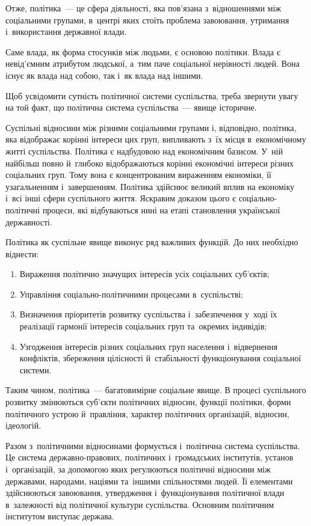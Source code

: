 \documentclass[a5paper,oneside,DIV=12,12pt,headings=small]{scrartcl}
\begin{document}
		Отже, політика~— це сфера діяльності, яка пов'язана з~відношеннями між соціальними групами, в~центрі яких стоїть проблема завоювання, утримання і~використання державної влади.
		
		Саме влада, як форма стосунків між людьми, є основою політики. Влада є невід'ємним атрибутом людської, а~тим паче соціальної нерівності людей. Вона існує як влада над собою, так і~як влада над іншими.
		
		Щоб усвідомити сутність політичної системи суспільства, треба звернути увагу на той факт, що політична система суспільства~— явище історичне.
		
		Суспільні відносини між різними соціальними групами і, відповідно, політика, яка відображає корінні інтереси цих груп, випливають з~їх місця в~економічному житті суспільства. Політика є надбудовою над економічним базисом. У~ній найбільш повно й~глибоко відображаються корінні економічні інтереси різних соціальних груп. Тому вона є концентрованим вираженням економіки, її узагальненням і~завершенням. Політика здійснює великий вплив на економіку і~всі інші сфери суспільного життя. Яскравим доказом цього є соціально-політичні процеси, які відбуваються нині на етапі становлення української державності.
		
		Політика як суспільне явище виконує ряд важливих функцій. До них необхідно віднести:
		\begin{enumerate}
			\item Вираження політично значущих інтересів усіх соціальних суб'\-єктів;
			\item Управління соціально-політичними процесами в~суспільстві;
			\item Визначення пріоритетів розвитку суспільства і~забезпечення у~ході їх реалізації гармонії інтересів соціальних груп та~окремих індивідів;
			\item Узгодження інтересів різних соціальних груп населення і~відвернення конфліктів, збереження цілісності й~стабільності функціонування соціальної системи.
		\end{enumerate}
		
		Таким чином, політика~— багатовимірне соціальне явище. В процесі суспільного розвитку змінюються суб'\-єкти політичних відносин, функції політики, форми політичного устрою й~правління, характер політичних організацій, відносин, ідеологій.
		
		Разом з~політичними відносинами формується і~політична система суспільства. Це система дер\-жав\-но-пра\-во\-вих, політичних і~громадських інститутів, установ і~організацій, за допомогою яких регулюються політичні відносини між державами, народами, націями та~іншими спільностями людей. Її елементами здійснюються завоювання, утвердження і~функціонування політичної влади в~залежності від політичної культури суспільства. Основним політичним інститутом виступає держава.
\end{document}

